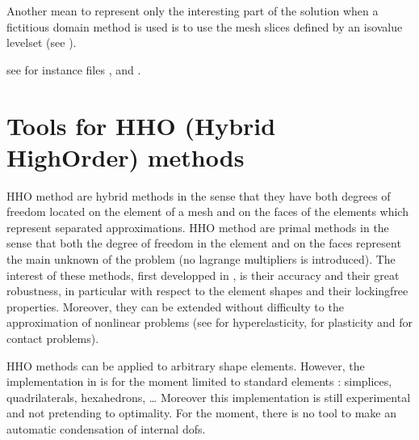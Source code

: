 \documentclass[a4paper,11pt,english]{sphinxmanual}
\begin{document}
Another mean to represent only the interesting part of the solution when a fictitious domain method is used is to use the mesh slices defined by an isovalue level\sphinxhyphen{}set (see {\hyperref[\detokenize{userdoc/export:ud-export-slices}]{}}).

see for instance files ,  and .


\chapter{Tools for HHO (Hybrid High\sphinxhyphen{}Order) methods}
\label{\detokenize{userdoc/hho:tools-for-hho-hybrid-high-order-methods}}\label{\detokenize{userdoc/hho:ud-hho}}\label{\detokenize{userdoc/hho::doc}}
HHO method are hybrid methods in the sense that they have both degrees of freedom located on the element of a mesh and on the faces of the elements which represent separated approximations. HHO method are primal methods in the sense that both the degree of freedom in the element and on the faces represent the main unknown of the problem (no lagrange multipliers is introduced). The interest of these methods, first developped in  ,  is their accuracy and their great robustness, in particular with respect to the element shapes and their locking\sphinxhyphen{}free properties. Moreover, they can be extended without difficulty to the approximation of nonlinear problems (see  for hyper\sphinxhyphen{}elasticity,  for plasticity and  for contact problems).

HHO methods can be applied to arbitrary shape elements. However, the implementation in  is for the moment limited to standard elements : simplices, quadrilaterals, hexahedrons, … Moreover this implementation is still experimental and not pretending to optimality. For the moment, there is no tool to make an automatic condensation of internal dofs.
\end{document}
